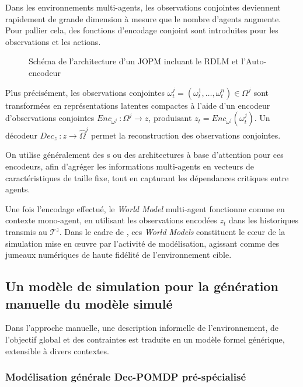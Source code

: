 Dans les environnements multi-agents, les observations conjointes deviennent rapidement de grande dimension à mesure que le nombre d'agents augmente. Pour pallier cela, des fonctions d'encodage conjoint sont introduites pour les observations et les actions.

\begin{figure}[h]
  \centering
  \resizebox{\textwidth}{!}{%
    
  }
  \caption{Schéma de l'architecture d'un JOPM incluant le RDLM et l'Auto-encodeur}
  \label{fig:jopm_architecture}
\end{figure}


Plus précisément, les observations conjointes $\omega_t^{j} = (\omega_t^1, \dots, \omega_t^n) \in \Omega^{j}$ sont transformées en représentations latentes compactes à l'aide d'un encodeur d'observations conjointes $Enc_{\omega^j}~: \Omega^j \rightarrow z$, produisant $z_t = Enc_{\omega^j}(\omega_t^j)$. Un décodeur $Dec_z~: z \rightarrow \hat{\Omega}^j$ permet la reconstruction des observations conjointes.

On utilise généralement des s ou des architectures à base d'attention pour ces encodeurs, afin d'agréger les informations multi-agents en vecteurs de caractéristiques de taille fixe, tout en capturant les dépendances critiques entre agents.

Une fois l'encodage effectué, le \textit{World Model} multi-agent fonctionne comme en contexte mono-agent, en utilisant les observations encodées $z_t$ dans les historiques transmis au  $\mathcal{T}^{z}$. Dans le cadre de , ces \textit{World Models} constituent le cœur de la simulation mise en œuvre par l'activité de modélisation, agissant comme des jumeaux numériques de haute fidélité de l'environnement cible.

\subsection{Un modèle de simulation pour la génération manuelle du modèle simulé}

Dans l'approche manuelle, une description informelle de l'environnement, de l'objectif global et des contraintes est traduite en un modèle formel générique, extensible à divers contextes.

\subsubsection{Modélisation générale Dec-POMDP pré-spécialisé}


